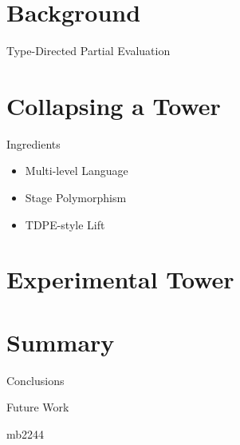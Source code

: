 \documentclass{beamer}
\begin{document}
\section{Background}
\begin{frame}{Type-Directed Partial Evaluation}
\end{frame}
\begin{frame}{\texorpdfstring{\mslang}{}}
\end{frame}
\section{Collapsing a Tower}
\begin{frame}{Ingredients}
    \begin{itemize}
        \item Multi-level Language
        \item Stage Polymorphism
        \item TDPE-style Lift
    \end{itemize}
\end{frame}
\section{Experimental Tower}

\section{Summary}
\begin{frame}{Conclusions}
\end{frame}
\begin{frame}{Future Work}
\end{frame}

\begin{frame}
\Huge{\centerline{mb2244}}
\end{frame}
\end{document}
